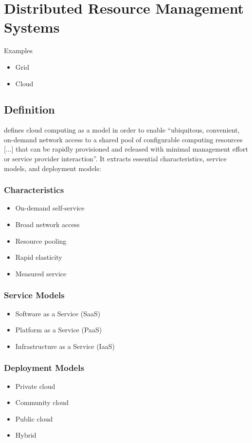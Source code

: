 \section{Distributed Resource Management Systems}
\label{sec:distributed-resource-management-systems}

Examples
\begin{itemize}
  \item Grid
  \item Cloud
\end{itemize}

\subsection{Definition}

 \cite{mell2011} defines cloud computing as a model in order
to enable ``ubiquitous, convenient, on-demand network access to a shared pool of
configurable computing resources [...] that can be rapidly provisioned and
released with minimal management effort or service provider interaction''. It
extracts essential characteristics, service models, and deployment models:

\subsubsection{Characteristics}

\begin{itemize}
  \item On-demand self-service
  \item Broad network access
  \item Resource pooling
  \item Rapid elasticity
  \item Measured service
\end{itemize}

\subsubsection{Service Models}

\begin{itemize}
  \item Software as a Service (SaaS)
  \item Platform as a Service (PaaS)
  \item Infrastructure as a Service (IaaS)
\end{itemize}

\subsubsection{Deployment Models}

\begin{itemize}
  \item Private cloud
  \item Community cloud
  \item Public cloud
  \item Hybrid
\end{itemize}
